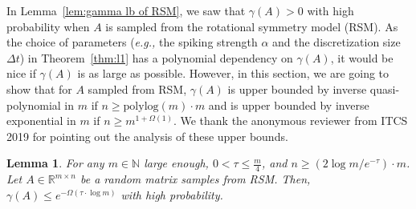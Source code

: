 \documentclass[11pt]{article}
\newtheorem{lemma}{Lemma}[section]
\theoremstyle{remark}
\theoremstyle{definition}
\newcommand{\Dt}{\Delta t}
\newcommand{\R}{{\mathbb R}} %
\newcommand{\N}{{\mathbb{N}}} %
\newcommand{\polylog}{{\mathrm{polylog}}}
\begin{document}
In Lemma~\ref{lem:gamma lb of RSM}, we saw that $\gamma(A)>0$ with high probability when $A$ is sampled from the rotational symmetry model (RSM). As the choice of parameters (\textit{e.g.,} the spiking strength $\alpha$ and the discretization size $\Dt$) in Theorem~\ref{thm:l1} has a polynomial dependency on $\gamma(A)$, it would be nice if $\gamma(A)$ is as large as possible. However, in this section, we are going to show that for $A$ sampled from RSM, $\gamma(A)$ is upper bounded by inverse quasi-polynomial in $m$ if $n\geq\polylog(m)\cdot m$ and is upper bounded by inverse exponential in $m$ if $n\geq m^{1+\Omega(1)}$. We thank the anonymous reviewer from ITCS 2019 for pointing out the analysis of these upper bounds.

\begin{lemma}\label{lem:gamma ub of RSM}
	For any $m\in\N$ large enough, $0<\tau\leq\frac{m}{4}$, and $n\geq(2\log m/e^{-\tau})\cdot m$. Let $A\in\R^{m\times n}$ be a random matrix samples from RSM. Then, $\gamma(A)\leq e^{-\Omega(\tau\cdot\log m)}$ with high probability.
\end{lemma}
\end{document}
